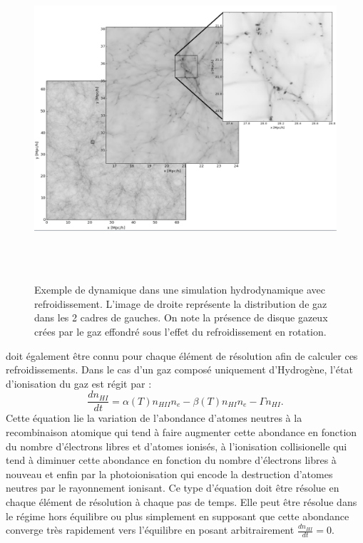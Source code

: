 \begin{figure}[htbp]
	\centering
		\includegraphics[height=12cm]{figs/zoom.png}
	\caption{Exemple de dynamique dans une simulation hydrodynamique avec refroidissement. L'image de droite représente la distribution de gaz dans les 2 cadres de gauches. On note la présence de disque gazeux crées par le gaz effondré sous l'effet du refroidissement en rotation.}
	\label{f:zoom}
\end{figure}



 doit également être connu pour chaque élément de résolution afin de calculer ces refroidissements. Dans le cas d'un gaz composé uniquement d'Hydrogène, l'état d'ionisation du gaz est régit par :
\begin{equation}
\frac{dn_{HI}}{dt}=\alpha(T) n_{HII} n_e-\beta(T) n_{HI}n_e-\Gamma n_{HI}.
\label{e:eint}
\end{equation}
Cette équation lie la variation de l'abondance d'atomes neutres à la recombinaison atomique  qui tend à faire augmenter cette abondance en fonction du nombre d'électrons libres et d'atomes ionisés, à l'ionisation collisionelle  qui tend à diminuer cette abondance en fonction du nombre d'électrons libres à nouveau et enfin par la photoionisation  qui encode la destruction d'atomes neutres par le rayonnement ionisant. Ce type d'équation doit être résolue en chaque élément de résolution à chaque pas de temps. Elle peut être résolue dans le régime hors équilibre ou plus simplement en supposant que cette abondance converge très rapidement vers l'équilibre en posant arbitrairement $\frac{dn_{HI}}{dt}=0$.

